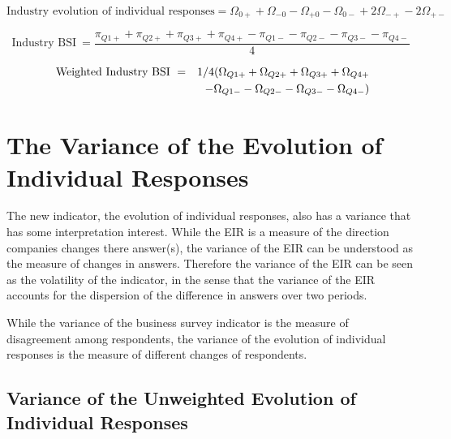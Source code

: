 \documentclass[12pt,a4paper,oneside]{book}
\begin{document}
\begin{equation}
    \text{Industry evolution of individual responses} = \Omega_{0+} + \Omega_{-0} - \Omega_{+0} - \Omega_{0-} +2\Omega_{-+} -2\Omega_{+-} 
\end{equation}



\begin{equation}
    \mbox{Industry BSI}\ = \frac{\pi_{Q1+} + \pi_{Q2+} + \pi_{Q3+} + \pi_{Q4+} - \pi_{Q1-} - \pi_{Q2-} - \pi_{Q3-} - \pi_{Q4-} }{4}
\end{equation}


\begin{eqnarray}
    \mbox{ Weighted Industry BSI}\ &=& 1/4 ( \Omega_{Q1+} + \Omega_{Q2+} + \Omega_{Q3+} + \Omega_{Q4+} \\
    && - \Omega_{Q1-} - \Omega_{Q2-} - \Omega_{Q3-} - \Omega_{Q4-} \Large) 
\end{eqnarray}



\chapter{The Variance of the Evolution of Individual Responses} \label{Chapter:Var Z}

The new indicator, the evolution of individual responses, also has a variance that has some interpretation interest. 
While the EIR is a measure of the direction companies changes there answer(s), the variance of the EIR can be understood as the measure of changes in answers. 
Therefore the variance of the EIR can be seen as the volatility of the indicator, in the sense that the variance of the EIR accounts for the dispersion of the difference in answers over two periods.

While the variance of the business survey indicator is the measure  of disagreement among respondents, the variance of the evolution of individual responses is the measure of different changes of respondents.


\section{Variance of the Unweighted Evolution of Individual Responses}
\end{document}
